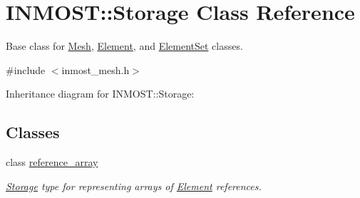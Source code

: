 \hypertarget{classINMOST_1_1Storage}{\section{I\-N\-M\-O\-S\-T\-:\-:Storage Class Reference}
\label{classINMOST_1_1Storage}
}


Base class for \hyperlink{classINMOST_1_1Mesh}{Mesh}, \hyperlink{classINMOST_1_1Element}{Element}, and \hyperlink{classINMOST_1_1ElementSet}{Element\-Set} classes.  




{\ttfamily \#include $<$inmost\-\_\-mesh.\-h$>$}



Inheritance diagram for I\-N\-M\-O\-S\-T\-:\-:Storage\-:
\subsection*{Classes}
\begin{DoxyCompactItemize}
\item 
class \hyperlink{classINMOST_1_1Storage_1_1reference__array}{reference\-\_\-array}
\begin{DoxyCompactList}\small\item\em \hyperlink{classINMOST_1_1Storage}{Storage} type for representing arrays of \hyperlink{classINMOST_1_1Element}{Element} references. \end{DoxyCompactList}\end{DoxyCompactItemize}
